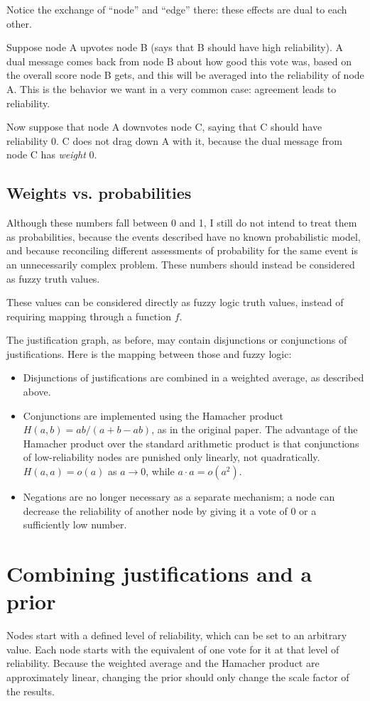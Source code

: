 \documentclass{article}
\begin{document}
Notice the exchange of ``node'' and ``edge'' there: these effects are dual to
each other. 

Suppose node A upvotes node B (says that B should have high reliability). A
dual message comes back from node B about how good this vote was, based on the
overall score node B gets, and this will be averaged into the reliability of
node A. This is the behavior we want in a very common case: agreement leads to
reliability.

Now suppose that node A downvotes node C, saying that C should have reliability
0. C does not drag down A with it, because the dual message from node C has
\emph{weight} 0.

\subsection{Weights vs. probabilities}

Although these numbers fall between 0 and 1, I still do not intend to treat
them as probabilities, because the events described have no known probabilistic
model, and because reconciling different assessments of probability for the
same event is an unnecessarily complex problem. These numbers should instead be
considered as fuzzy truth values.

These values can be considered directly as fuzzy logic truth values, instead of
requiring mapping through a function $f$.

The justification graph, as before, may contain disjunctions or conjunctions of
justifications. Here is the mapping between those and fuzzy logic:

\begin{itemize}
\item Disjunctions of justifications are combined in a weighted average, as
described above.
\item Conjunctions are implemented using the Hamacher product $H(a, b) =
ab/(a+b-ab)$, as in the original paper. The advantage of the Hamacher product
over the standard arithmetic product is that conjunctions of low-reliability
nodes are punished only linearly, not quadratically. $H(a, a) = o(a)$ as $a
\rightarrow 0$, while $a \cdot a = o(a^2)$.
\item Negations are no longer necessary as a separate mechanism; a node can decrease the reliability of another node by giving it a vote of 0 or a sufficiently low number.
\end{itemize}

\section{Combining justifications and a prior}

Nodes start with a defined level of reliability, which can be set to an
arbitrary value. Each node starts with the equivalent of one vote for it at
that level of reliability. Because the weighted average and the Hamacher
product are approximately linear, changing the prior should only change the
scale factor of the results.
\end{document}
